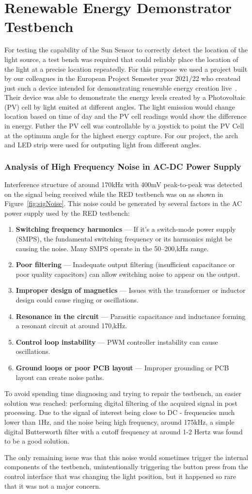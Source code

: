\section{Renewable Energy Demonstrator Testbench}
\label{REDtestbench}
For testing the capability of the Sun Sensor to correctly detect the location of the light source, a test bench was required that could reliably place the location of the light at a precise location repeatedly. For this purpose we used a project built by our colleagues in the European Project Semester year 2021/22 who createad just such a device intended for demonstrating renewable energy creation live~\cite{RefWorks:shopov2022renewable}. Their device was able to demonstrate the energy levels created by a Photovoltaic (PV) cell by light emited at different angles. The light emission would change location based on time of day and the PV cell readings would show the difference in energy. Futher the PV cell was controllable by a joystick to point the PV Cell at the optimum angle for the highest energy capture. For our project, the arch and LED strip were used for outputing light from different angles.
\subsubsection*{Analysis of High Frequency Noise in AC-DC Power Supply}
Interference structure of around 170kHz with 400mV peak-to-peak was detected on the signal being received while the RED testbench was on as shown in Figure~\ref{fig:sigNoise}. This noise could be generated by several factors in the AC power supply used by the RED testbench:
\begin{enumerate}[label=\arabic*.]
\item \textbf{Switching frequency harmonics} --- If it's a switch-mode power supply (SMPS), the fundamental switching frequency or its harmonics might be causing the noise. Many SMPS operate in the 50--200,kHz range.
\item \textbf{Poor filtering} --- Inadequate output filtering (insufficient capacitance or poor quality capacitors) can allow switching noise to appear on the output.
\item \textbf{Improper design of magnetics} --- Issues with the transformer or inductor design could cause ringing or oscillations.
\item \textbf{Resonance in the circuit} --- Parasitic capacitance and inductance forming a resonant circuit at around 170,kHz.
\item \textbf{Control loop instability} --- PWM controller instability can cause oscillations.
\item \textbf{Ground loops or poor PCB layout} --- Improper grounding or PCB layout can create noise paths.~\cite{RefWorks:giuliattini2006prediction}
\end{enumerate}
To avoid spending time diagnosing and trying to repair the testbench, an easier solution was reached: performing digital filtering of the acquired signal in post processing. Due to the signal of interest being close to DC - frequencies much lower than 1Hz, and the noise being high frequency, around 175kHz, a simple digital Butterworth filter with a cutoff frequency at around 1-2 Hertz was found to be a good solution.

The only remaining issue was that this noise would sometimes trigger the internal components of the testbench, unintentionally triggering the button press from the control interface that was changing the light position, but it happened so rare that it was not a major concern.